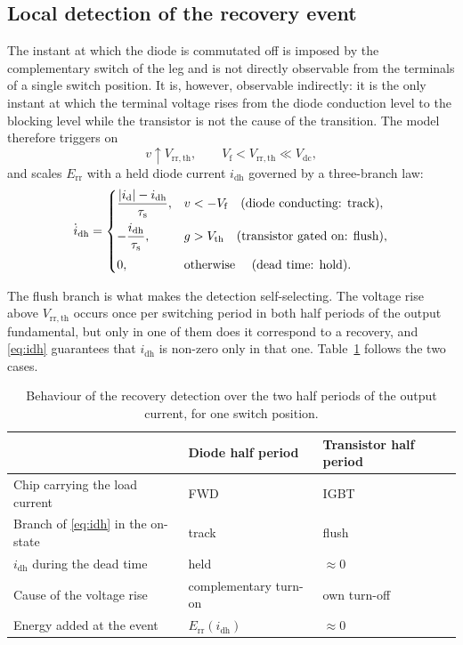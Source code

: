 \documentclass[11pt,a4paper]{article}
\begin{document}
\subsection{Local detection of the recovery event}

The instant at which the diode is commutated off is imposed by the
complementary switch of the leg and is not directly observable from the
terminals of a single switch position. It is, however, observable indirectly:
it is the only instant at which the terminal voltage rises from the diode
conduction level to the blocking level while the transistor is not the cause of
the transition. The model therefore triggers on
\begin{equation}
  v \uparrow V_\mathrm{rr,th},
  \qquad V_\mathrm{f} < V_\mathrm{rr,th} \ll V_\mathrm{dc},
\end{equation}
and scales $E_\mathrm{rr}$ with a held diode current $i_\mathrm{dh}$ governed by
a three-branch law:
\begin{equation}
  \dot{i}_\mathrm{dh} =
  \begin{cases}
    \dfrac{|i_\mathrm{d}| - i_\mathrm{dh}}{\tau_\mathrm{s}},
      & v < -V_\mathrm{f} \quad\text{(diode conducting: track)},\\[3mm]
    -\dfrac{i_\mathrm{dh}}{\tau_\mathrm{s}},
      & g > V_\mathrm{th} \quad\text{(transistor gated on: flush)},\\[3mm]
    0, & \text{otherwise \quad(dead time: hold)}.
  \end{cases}
  \label{eq:idh}
\end{equation}

The flush branch is what makes the detection self-selecting. The voltage rise
above $V_\mathrm{rr,th}$ occurs once per switching period in both half periods
of the output fundamental, but only in one of them does it correspond to a
recovery, and \eqref{eq:idh} guarantees that $i_\mathrm{dh}$ is non-zero only in
that one. Table~\ref{tab:halfperiods} follows the two cases.

\begin{table}[h]
\centering
\caption{Behaviour of the recovery detection over the two half periods of the
output current, for one switch position.}
\label{tab:halfperiods}
\begin{tabular}{lll}
\toprule
 & Diode half period & Transistor half period \\
\midrule
Chip carrying the load current & FWD & IGBT \\
Branch of \eqref{eq:idh} in the on-state & track & flush \\
$i_\mathrm{dh}$ during the dead time & held & $\approx 0$ \\
Cause of the voltage rise & complementary turn-on & own turn-off \\
Energy added at the event & $E_\mathrm{rr}(i_\mathrm{dh})$ & $\approx 0$ \\
\bottomrule
\end{tabular}
\end{table}
\end{document}
